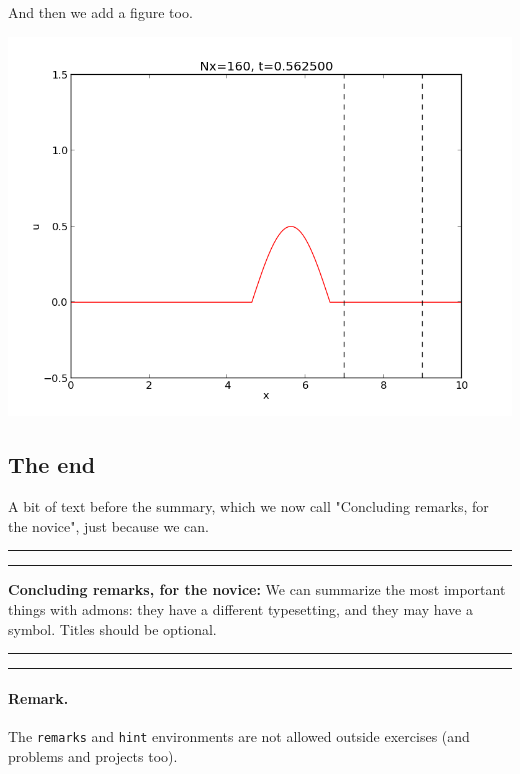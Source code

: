 \documentclass[%
oneside,                 %
final,                   %
10pt]{article}
\newcommand{\grayboxhrules}[1]{\begin{center}
\colorbox{graybox2_warning_background}{\rule{6pt}{0pt}
\begin{minipage}{0.8\linewidth}
\parbox[t]{0mm}{\rule[0pt]{0mm}{0.5\baselineskip}}\hrule
\vspace*{0.5\baselineskip}\noindent #1
\parbox[t]{0mm}{\rule[-0.5\baselineskip]{0mm}%
{\baselineskip}}\hrule\vspace*{0.5\baselineskip}\end{minipage}
\rule{6pt}{0pt}}\end{center}}
\newenvironment{graybox2admon}[1][]{
\begin{graybox2mdframed}[frametitle=#1]
}
{
\end{graybox2mdframed}
}
\begin{document}
\begin{graybox2admon}[Going deeper.]
\begin{lstlisting}[language=Python,style=simple,xleftmargin=2mm]
\end{lstlisting}

And then we add a figure too.
\vspace{6mm}
\centerline{\includegraphics[width=0.7\linewidth]{testfigs/wave1D.png}}
\vspace{6mm}
\end{graybox2admon}



\subsection{The end}
A bit of text before the summary, which we now call "Concluding remarks,
for the novice",
just because we can.

\grayboxhrules{
\textbf{Concluding remarks, for the novice:} We can summarize the most important things with admons: they have
a different typesetting, and they may have a symbol.
Titles should be optional.
}

\paragraph{Remark.}
The \texttt{remarks} and \texttt{hint} environments are not allowed outside
exercises (and problems and projects too).
\end{document}
